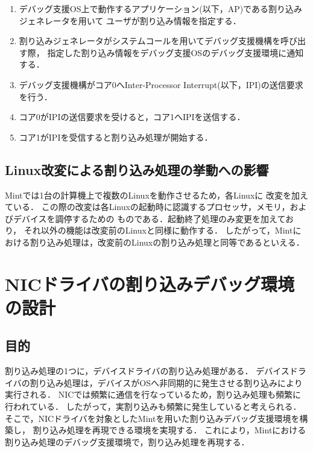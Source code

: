 \documentclass[submit,techreq,noauthor,dvipdfmx]{ipsj}
\begin{document}
\begin{enumerate}
    \item 
        デバッグ支援OS上で動作するアプリケーション(以下，AP)である割り込みジェネレータを用いて
        ユーザが割り込み情報を指定する．
    \item 
        割り込みジェネレータがシステムコールを用いてデバッグ支援機構を呼び出す際，
        指定した割り込み情報をデバッグ支援OSのデバッグ支援環境に通知する．   
    \item 
        デバッグ支援機構がコア0へInter-Processor Interrupt(以下，IPI)の送信要求を行う．
    \item 
        コア0がIPIの送信要求を受けると，コア1へIPIを送信する．
    \item 
        コア1がIPIを受信すると割り込み処理が開始する．
\end{enumerate}

\subsection{Linux改変による割り込み処理の挙動への影響}\label{sec:impact_to_linux}

Mintでは1台の計算機上で複数のLinuxを動作させるため，各Linuxに
改変を加えている\cite{kitagawa}．
この際の改変は各Linuxの起動時に認識するプロセッサ，メモリ，およびデバイスを調停するための
ものである．起動終了処理のみ変更を加えており，
それ以外の機能は改変前のLinuxと同様に動作する．
したがって，Mintにおける割り込み処理は，改変前のLinuxの割り込み処理と同等であるといえる．

\section{NICドライバの割り込みデバッグ環境の設計}\label{chap:design_of_debugging_invironment_of_NIC}

\subsection{目的}\label{sec:purpose}

割り込み処理の1つに，デバイスドライバの割り込み処理がある．
デバイスドライバの割り込み処理は，デバイスがOSへ非同期的に発生させる割り込みにより
実行される．
NICでは頻繁に通信を行なっているため，割り込み処理も頻繁に行われている．
したがって，実割り込みも頻繁に発生していると考えられる．
そこで，NICドライバを対象としたMintを用いた割り込みデバッグ支援環境を構築し，
割り込み処理を再現できる環境を実現する．
これにより，Mintにおける割り込み処理のデバッグ支援環境で，割り込み処理を再現する．
\end{document}
